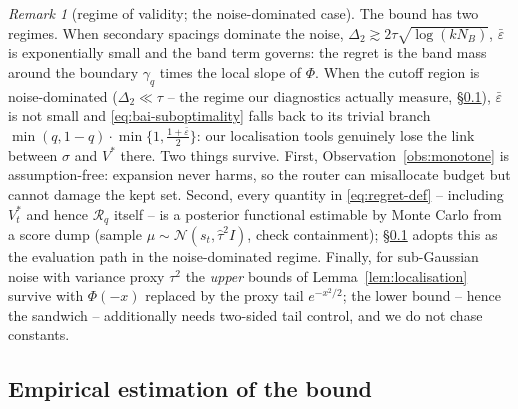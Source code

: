 \documentclass[11pt]{article}
\theoremstyle{remark}
\newtheorem{remark}{Remark}
\newcommand{\NB}{N_{\!B}}
\begin{document}
\begin{remark}[regime of validity; the noise-dominated case]\label{rem:regime}
The bound has two regimes. When secondary spacings dominate the noise, $\Delta_2 \gtrsim 2\tau\sqrt{\log(k\NB)}$, $\bar\varepsilon$ is exponentially small and the band term governs: the regret is the band mass around the boundary $\gamma_q$ times the local slope of $\Phi$. When the cutoff region is noise-dominated ($\Delta_2 \ll \tau$ -- the regime our diagnostics actually measure, \S\ref{app:bai:empirical}), $\bar\varepsilon$ is not small and \eqref{eq:bai-suboptimality} falls back to its trivial branch $\min(q, 1-q) \cdot \min\{1, \tfrac{1+\bar\varepsilon}{2}\}$: our localisation tools genuinely lose the link between $\sigma$ and $V^*$ there. Two things survive. First, Observation~\ref{obs:monotone} is assumption-free: expansion never harms, so the router can misallocate budget but cannot damage the kept set. Second, every quantity in \eqref{eq:regret-def} -- including $V^*_t$ and hence $\mathcal R_q$ itself -- is a posterior functional estimable by Monte Carlo from a score dump (sample $\mu \sim \mathcal N(s_t, \hat\tau^2 I)$, check containment); \S\ref{app:bai:empirical} adopts this as the evaluation path in the noise-dominated regime. Finally, for sub-Gaussian noise with variance proxy $\tau^2$ the \emph{upper} bounds of Lemma~\ref{lem:localisation} survive with $\Phi(-x)$ replaced by the proxy tail $e^{-x^2/2}$; the lower bound -- hence the sandwich -- additionally needs two-sided tail control, and we do not chase constants.
\end{remark}

\subsection{Empirical estimation of the bound}\label{app:bai:empirical}
\end{document}
